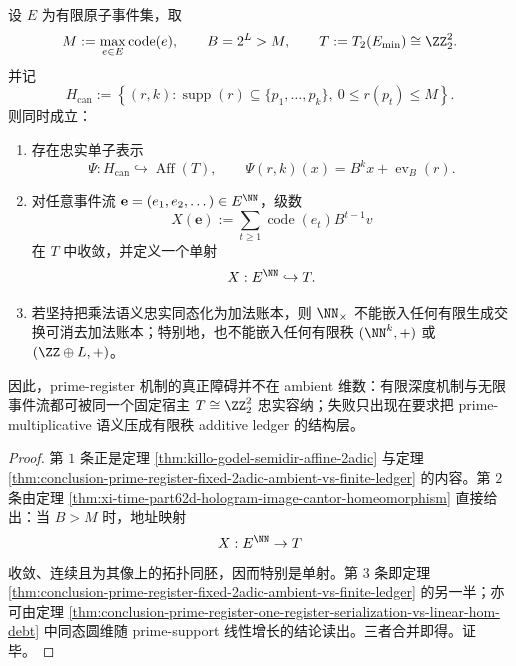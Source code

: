 \begin{theorem}\label{thm:conclusion-prime-register-ranktwo-host-nonobstruction}
设 \(E\) 为有限原子事件集，取
\[
M:=\max_{e\in E}\operatorname{code}(e),
\qquad
B=2^L>M,
\qquad
T:=T_2(E_{\min})\cong \ZZ_2^2.
\]
并记
\[
H_{\mathrm{can}}
:=
\left\{
(r,k):
\operatorname{supp}(r)\subseteq \{p_1,\dots,p_k\},\
0\le r(p_t)\le M
\right\}.
\]
则同时成立：
\begin{enumerate}
\normalfont
  \item 存在忠实单子表示
  \[
  \Psi:H_{\mathrm{can}}\hookrightarrow \operatorname{Aff}(T),
  \qquad
  \Psi(r,k)(x)=B^k x+\operatorname{ev}_B(r).
  \]
  \item 对任意事件流 \(\mathbf e=(e_1,e_2,\dots)\in E^{\NN}\)，级数
  \[
  X(\mathbf e):=\sum_{t\ge 1}\operatorname{code}(e_t)B^{t-1}v
  \]
  在 \(T\) 中收敛，并定义一个单射
  \[
  X:E^{\NN}\hookrightarrow T.
  \]
  \item 若坚持把乘法语义忠实同态化为加法账本，则 \(\NN_{\times}\) 不能嵌入任何有限生成交换可消去加法账本；特别地，也不能嵌入任何有限秩 \((\NN^k,+)\) 或 \((\ZZ\oplus L,+)\)。
\end{enumerate}
因此，prime-register 机制的真正障碍并不在 ambient 维数：有限深度机制与无限事件流都可被同一个固定宿主 \(T\cong \ZZ_2^2\) 忠实容纳；失败只出现在要求把 prime-multiplicative 语义压成有限秩 additive ledger 的结构层。
\end{theorem}
\begin{proof}
第 \(1\) 条正是定理 \ref{thm:killo-godel-semidir-affine-2adic} 与定理 \ref{thm:conclusion-prime-register-fixed-2adic-ambient-vs-finite-ledger} 的内容。第 \(2\) 条由定理 \ref{thm:xi-time-part62d-hologram-image-cantor-homeomorphism} 直接给出：当 \(B>M\) 时，地址映射
\[
X:E^{\NN}\to T
\]
收敛、连续且为其像上的拓扑同胚，因而特别是单射。第 \(3\) 条即定理 \ref{thm:conclusion-prime-register-fixed-2adic-ambient-vs-finite-ledger} 的另一半；亦可由定理 \ref{thm:conclusion-prime-register-one-register-serialization-vs-linear-hom-debt} 中同态圆维随 prime-support 线性增长的结论读出。三者合并即得。证毕。
\end{proof}

